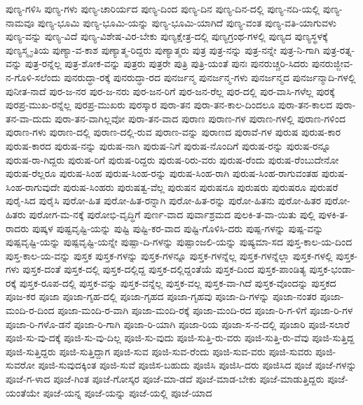 {ಪುಣ್ಯ-ಗಳಿಸಿ
ಪುಣ್ಯ-ಗಳು
ಪುಣ್ಯ-ಚಾರಿರ್ಯದ
ಪುಣ್ಯ-ದಿಂದ
ಪುಣ್ಯ-ದಿನ
ಪುಣ್ಯ-ದಿನ-ದಲ್ಲಿ
ಪುಣ್ಯ-ನದಿ-ಯಲ್ಲಿ
ಪುಣ್ಯ-ನಾಮವೂ
ಪುಣ್ಯ-ಭೂಮಿ
ಪುಣ್ಯ-ಭೂಮಿ-ಯನ್ನು
ಪುಣ್ಯ-ಭೂಮಿ-ಯಾಗಿದೆ
ಪುಣ್ಯ-ವಂತ
ಪುಣ್ಯ-ವತಿ-ಯಾಗುವಳು
ಪುಣ್ಯ-ವನ್ನು
ಪುಣ್ಯ-ವಿದೆ
ಪುಣ್ಯ-ವಿಶೇಷ-ವಿರ-ಬೇಕು
ಪುಣ್ಯಕ್ಷೇತ್ರ-ದಲ್ಲಿ
ಪುಣ್ಯಗ್ರಂಥ-ಗಳಲ್ಲಿ
ಪುಣ್ಯದ
ಪುಣ್ಯಸ್ಥಳಕ್ಕೆ
ಪುಣ್ಯಸ್ಮೃ-ತಿಯ
ಪುಣ್ಯಾ-ವ-ಕಾಶ
ಪುಣ್ಯಾತ್ಮ-ರಿದ್ದರು
ಪುಣ್ಯಾತ್ಮರು
ಪುತ್ರ
ಪುತ್ರ-ನನ್ನು
ಪುತ್ರ-ನನ್ನೇ
ಪುತ್ರ-ನಿ-ಗಾಗಿ
ಪುತ್ರ-ರತ್ನ-ವನ್ನು
ಪುತ್ರ-ರನ್ನೆಲ್ಲ
ಪುತ್ರ-ಶೋಕ-ವನ್ನು
ಪುತ್ರರು
ಪುತ್ರರೇ
ಪುತ್ರಿ
ಪುತ್ರಿ-ಯಂತೆ
ಪುನಃ
ಪುನರುಚ್ಚರಿ-ಸಿದರು
ಪುನರುಜ್ಜೀವ-ನ-ಗೊಳಿ-ಸಲೆಂದು
ಪುನರುದ್ಧಾ-ರಕ್ಕೆ
ಪುನರುದ್ಧಾ-ರದ
ಪುನರ್ಜನ್ಮ
ಪುನರ್ಜನ್ಮ-ಗಳು
ಪುನರ್ಜನ್ಮದ
ಪುನರ್ಜನ್ಮಾದಿ-ಗಳಲ್ಲಿ
ಪುನೀತ-ನಾದೆ
ಪುರ-ಜ-ನರ
ಪುರ-ಜ-ನರು
ಪುರ-ಜನ-ರಿಗೆ
ಪುರ-ಜನ-ರೆಲ್ಲ
ಪುರ-ದಲ್ಲಿ
ಪುರ-ವಾಸಿ-ಗಳೆಲ್ಲ
ಪುರಕ್ಕೆ
ಪುರಪ್ರ-ಮುಖ-ರನ್ನೆಲ್ಲ
ಪುರಪ್ರ-ಮುಖರು
ಪುರಸ್ಕಾರ
ಪುರಾ-ತನ
ಪುರಾ-ತನ-ಕಾಲ-ದಿಂದಲೂ
ಪುರಾ-ತನ-ಕಾಲದ
ಪುರಾ-ತನ-ವಾ-ದುದು
ಪುರಾ-ತನ-ವಾಗಿಲ್ಲವೋ
ಪುರಾ-ತನ-ವಾದ
ಪುರಾಣ
ಪುರಾಣ-ಗಳ
ಪುರಾಣ-ಗಳಲ್ಲಿ
ಪುರಾಣ-ಗಳಿಂದ
ಪುರಾಣ-ಗಳು
ಪುರಾಣ-ದಲ್ಲಿ
ಪುರಾಣ-ದಲ್ಲಿ-ರುವ
ಪುರಾಣ-ವನ್ನು
ಪುರಾಣದ
ಪುರಾವೆ-ಗಳ
ಪುರುಷ
ಪುರುಷ-ಕಾರ
ಪುರುಷ-ಕಾರದ
ಪುರುಷ-ನನ್ನು
ಪುರುಷ-ನಾಗಿ
ಪುರುಷ-ನಿಗೆ
ಪುರುಷ-ನೊಂದಿಗೆ
ಪುರುಷ-ರನ್ನು
ಪುರುಷ-ರನ್ನೂ
ಪುರುಷ-ರಾ-ಗಿದ್ದರು
ಪುರುಷ-ರಿಗೆ
ಪುರುಷ-ರಿದ್ದರು
ಪುರುಷ-ರಿರು-ವರು
ಪುರುಷ-ರೆಂದು
ಪುರುಷ-ರೆಂಬುದೇನೋ
ಪುರುಷ-ರೆಲ್ಲರೂ
ಪುರುಷ-ಸಿಂಹ
ಪುರುಷ-ಸಿಂಹ-ರನ್ನು
ಪುರುಷ-ಸಿಂಹ-ರಾಗಿ
ಪುರುಷ-ಸಿಂಹ-ರಾಗುವಂತಹ
ಪುರುಷ-ಸಿಂಹ-ರಾಗುವುದೇ
ಪುರುಷ-ಸಿಂಹರು
ಪುರುಷತ್ವ-ವೆಲ್ಲ
ಪುರುಷನ
ಪುರುಷನೂ
ಪುರುಷರು
ಪುರುಷರೂ
ಪುರುಷರೆ
ಪುರೈ-ಸಿದ
ಪುರೈಸಿ
ಪುರೋ-ಹಿತ
ಪುರೋ-ಹಿತ-ರನ್ನಾಗಿ
ಪುರೋ-ಹಿತ-ರನ್ನು
ಪುರೋ-ಹಿತನು
ಪುರೋ-ಹಿತರ
ಪುರೋ-ಹಿತರು
ಪುರೋಗ-ಮ-ನಕ್ಕೆ
ಪುರೋಭಿ-ವೃದ್ಧಿಗೆ
ಪುರ್ಣ-ವಾದ
ಪುರ್ವಾಶ್ರಮದ
ಪುಲಕಿ-ತ-ವಾ-ಯಿತು
ಪುಲ್ಲಿ
ಪುಳಕಿ-ತ-ರಾದರು
ಪುಷ್ಕಳ
ಪುಷ್ಟವೃಷ್ಟಿ-ಯನ್ನು
ಪುಷ್ಟಿ
ಪುಷ್ಟಿ-ಕರ-ವಾದ
ಪುಷ್ಟಿ-ಗೊಳಿಸಿ-ದರು
ಪುಷ್ಪ-ಗಳನ್ನು
ಪುಷ್ಪ-ವನ್ನು
ಪುಷ್ಪವೃಷ್ಟಿ-ಯನ್ನು
ಪುಷ್ಪವೃಷ್ಟಿ-ಯನ್ನೇ
ಪುಷ್ಪಾ-ದಿ-ಗಳನ್ನು
ಪುಷ್ಪಾಂಜಲಿ-ಯನ್ನು
ಪುಷ್ಯಮಾ-ಸದ
ಪುಸ್ತ-ಕಾಲ-ಯ-ದಿಂದ
ಪುಸ್ತ-ಕಾಲ-ಯ-ವನ್ನು
ಪುಸ್ತಕ
ಪುಸ್ತಕ-ಗಳನ್ನು
ಪುಸ್ತಕ-ಗಳನ್ನೂ
ಪುಸ್ತಕ-ಗಳನ್ನೆಲ್ಲ
ಪುಸ್ತಕ-ಗಳನ್ನೆಲ್ಲಾ
ಪುಸ್ತಕ-ಗಳಲ್ಲಿ
ಪುಸ್ತಕ-ಗಳು
ಪುಸ್ತಕ-ದಂತೆ
ಪುಸ್ತಕ-ದಲ್ಲಿ
ಪುಸ್ತಕ-ದಲ್ಲಿದ್ದ
ಪುಸ್ತಕ-ದಲ್ಲಿದ್ದಂತೆಯೆ
ಪುಸ್ತಕ-ದಿಂದ
ಪುಸ್ತಕ-ಪಾಂಡಿತ್ಯ
ಪುಸ್ತಕ-ಭಂಡಾ-ರಕ್ಕೆ
ಪುಸ್ತಕ-ರೂಪ-ದಲ್ಲಿ
ಪುಸ್ತಕ-ವನ್ನು
ಪುಸ್ತಕ-ವನ್ನೆಲ್ಲ
ಪುಸ್ತಕ-ವಲ್ಲ
ಪುಸ್ತಕ-ವಾ-ಗಿದೆ
ಪುಸ್ತಕ-ವೊಂದನ್ನು
ಪುಸ್ತಕದ
ಪೂಜ-ಕರ
ಪೂಜಾ
ಪೂಜಾ-ಗೃಹ-ದಲ್ಲಿ
ಪೂಜಾ-ಗೃಹದ
ಪೂಜಾ-ಗೃಹವು
ಪೂಜಾ-ದಿ-ಗಳನ್ನು
ಪೂಜಾ-ನಂತರ
ಪೂಜಾ-ಮಂದಿ-ರ-ದಿಂದ
ಪೂಜಾ-ಮಂದಿ-ರ-ವಾಗಿ
ಪೂಜಾ-ಮಂದಿ-ರಕ್ಕೆ
ಪೂಜಾ-ಮಂದಿ-ರದ
ಪೂಜಾ-ರಿ-ಗ-ಳಿಗೆ
ಪೂಜಾ-ರಿ-ಗಳ
ಪೂಜಾ-ರಿ-ಗಳೊ-ಡನೆ
ಪೂಜಾ-ರಿ-ಗಾಗಿ
ಪೂಜಾ-ರಿ-ಯಾಗಿ
ಪೂಜಾ-ರಿಯ
ಪೂಜಾ-ಸ-ನ-ದಲ್ಲಿ
ಪೂಜಾರಿ
ಪೂಜಿ-ಸಲಾರೆ
ಪೂಜಿ-ಸು-ವು-ದಕ್ಕೆ
ಪೂಜಿ-ಸು-ವು-ದಿಲ್ಲ
ಪೂಜಿ-ಸು-ವುದು
ಪೂಜಿ-ಸುತ್ತಿ-ರು-ವರು
ಪೂಜಿ-ಸುತ್ತಿ-ರು-ವೆವು
ಪೂಜಿ-ಸುತ್ತಿದ್ದ
ಪೂಜಿ-ಸುತ್ತಿದ್ದರು
ಪೂಜಿ-ಸುತ್ತಿದ್ದಾಗ
ಪೂಜಿ-ಸುವ
ಪೂಜಿ-ಸುವ-ರೆಂದು
ಪೂಜಿ-ಸುವ-ವರು
ಪೂಜಿ-ಸುವರು
ಪೂಜಿ-ಸುವರೋ
ಪೂಜಿ-ಸುವುದಕ್ಕಿಂತ
ಪೂಜಿ-ಸುವೆ
ಪೂಜಿಸ-ಬಹುದು
ಪೂಜಿಸಿ
ಪೂಜಿಸಿ-ದರು
ಪೂಜಿಸಿದ
ಪೂಜೆ
ಪೂಜೆ-ಗಳನ್ನು
ಪೂಜೆ-ಗ-ಳಾದ
ಪೂಜೆ-ಗಿಂತ
ಪೂಜೆ-ಗೋಸ್ಕರ
ಪೂಜೆ-ಮಾ-ಡದೆ
ಪೂಜೆ-ಮಾಡ-ಬೇಕು
ಪೂಜೆ-ಮಾಡುತ್ತಿದ್ದರು
ಪೂಜೆ-ಯಂತೆಯೇ
ಪೂಜೆ-ಯನ್ನ
ಪೂಜೆ-ಯನ್ನು
ಪೂಜೆ-ಯಲ್ಲಿ
ಪೂಜೆ-ಯಾದ
}
